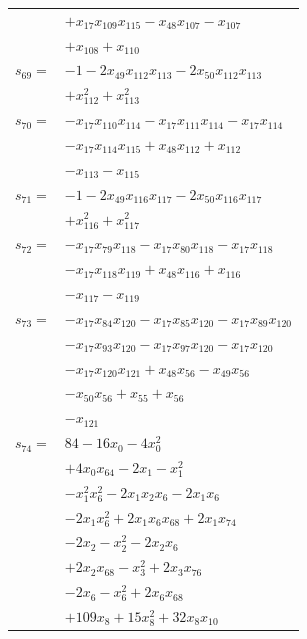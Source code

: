 \begin{longtable}{@{}r@{\;}l@{}}
 & \(\displaystyle +x_{17}x_{109}x_{115} -x_{48}x_{107} -x_{107}\) \\
 & \(\displaystyle +x_{108} +x_{110}\) \\[3pt]
\(s_{69}=\) & \(\displaystyle -1 -2x_{49}x_{112}x_{113} -2x_{50}x_{112}x_{113}\) \\
 & \(\displaystyle +x_{112}^{2} +x_{113}^{2}\) \\[3pt]
\(s_{70}=\) & \(\displaystyle -x_{17}x_{110}x_{114} -x_{17}x_{111}x_{114} -x_{17}x_{114}\) \\
 & \(\displaystyle -x_{17}x_{114}x_{115} +x_{48}x_{112} +x_{112}\) \\
 & \(\displaystyle -x_{113} -x_{115}\) \\[3pt]
\(s_{71}=\) & \(\displaystyle -1 -2x_{49}x_{116}x_{117} -2x_{50}x_{116}x_{117}\) \\
 & \(\displaystyle +x_{116}^{2} +x_{117}^{2}\) \\[3pt]
\(s_{72}=\) & \(\displaystyle -x_{17}x_{79}x_{118} -x_{17}x_{80}x_{118} -x_{17}x_{118}\) \\
 & \(\displaystyle -x_{17}x_{118}x_{119} +x_{48}x_{116} +x_{116}\) \\
 & \(\displaystyle -x_{117} -x_{119}\) \\[3pt]
\(s_{73}=\) & \(\displaystyle -x_{17}x_{84}x_{120} -x_{17}x_{85}x_{120} -x_{17}x_{89}x_{120}\) \\
 & \(\displaystyle -x_{17}x_{93}x_{120} -x_{17}x_{97}x_{120} -x_{17}x_{120}\) \\
 & \(\displaystyle -x_{17}x_{120}x_{121} +x_{48}x_{56} -x_{49}x_{56}\) \\
 & \(\displaystyle -x_{50}x_{56} +x_{55} +x_{56}\) \\
 & \(\displaystyle -x_{121}\) \\[3pt]
\(s_{74}=\) & \(\displaystyle 84 -16x_{0} -4x_{0}^{2}\) \\
 & \(\displaystyle +4x_{0}x_{64} -2x_{1} -x_{1}^{2}\) \\
 & \(\displaystyle -x_{1}^{2}x_{6}^{2} -2x_{1}x_{2}x_{6} -2x_{1}x_{6}\) \\
 & \(\displaystyle -2x_{1}x_{6}^{2} +2x_{1}x_{6}x_{68} +2x_{1}x_{74}\) \\
 & \(\displaystyle -2x_{2} -x_{2}^{2} -2x_{2}x_{6}\) \\
 & \(\displaystyle +2x_{2}x_{68} -x_{3}^{2} +2x_{3}x_{76}\) \\
 & \(\displaystyle -2x_{6} -x_{6}^{2} +2x_{6}x_{68}\) \\
 & \(\displaystyle +109x_{8} +15x_{8}^{2} +32x_{8}x_{10}\) \\

\end{longtable}

